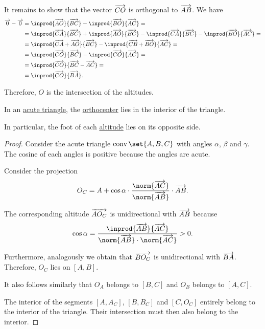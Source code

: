 \begin{defproof}
  It remains to show that the vector \( \overrightarrow{CO} \) is orthogonal to \( \overrightarrow{AB} \). We have
  \begin{align*}
    \vect 0 - \vect 0
    &=
    \inprod {\vect{AO}} {\vect{BC}} - \inprod {\vect{BO}} {\vect{AC}}
    = \\ &=
    \inprod {\vect{CA}} {\vect{BC}} + \inprod {\vect{AO}} {\vect{BC}} - \inprod {\vect{CA}} {\vect{BC}} - \inprod {\vect{BO}} {\vect{AC}}
    = \\ &=
    \inprod {\vect{CA} + \vect{AO}} {\vect{BC}} - \inprod {\vect{CB} + \vect{BO}} {\vect{AC}}
    = \\ &=
    \inprod {\vect{CO}} {\vect{BC}} - \inprod {\vect{CO}} {\vect{AC}}
    = \\ &=
    \inprod {\vect{CO}} {\vect{BC} - \vect{AC}}
    = \\ &=
    \inprod {\vect{CO}} {\vect{BA}}.
  \end{align*}

  Therefore, \( O \) is the intersection of the altitudes.
\end{defproof}

\begin{proposition}\label{thm:acute_triangle_orthocenter}
  In an \hyperref[def:triangle/acute]{acute triangle}, the \hyperref[def:orthocenter]{orthocenter} lies in the interior of the triangle.

  In particular, the foot of each \hyperref[def:triangle_altitude]{altitude} lies on its opposite side.
\end{proposition}
\begin{proof}
  Consider the acute triangle \( \conv\set{ A, B, C } \) with angles \( \alpha \), \( \beta \) and \( \gamma \). The cosine of each angles is positive because the angles are acute.

  Consider the projection
  \begin{equation*}
    O_C = A + \cos \alpha \cdot \frac {\norm{\vect{AC}}} {\norm{\vect{AB}}} \cdot \vect{AB}.
  \end{equation*}

  The corresponding altitude \( \overrightarrow{A O_C} \) is unidirectional with \( \overrightarrow{AB} \) because
  \begin{equation*}
    \cos \alpha = \frac {\inprod{ \vect{AB} } { \vect{AC}} } { \norm{\vect{AB}} \cdot \norm{\vect{AC}} } > 0.
  \end{equation*}

  Furthermore, analogously we obtain that \( \overrightarrow{B O_C} \) is unidirectional with \( \overrightarrow{BA} \). Therefore, \( O_C \) lies on \( [A, B] \).

  It also follows similarly that \( O_A \) belongs to \( [B, C] \) and \( O_B \) belongs to \( [A, C] \).

  The interior of the segments \( [A, A_C] \), \( [B, B_C] \) and \( [C, O_C] \) entirely belong to the interior of the triangle. Their intersection must then also belong to the interior.
\end{proof}

